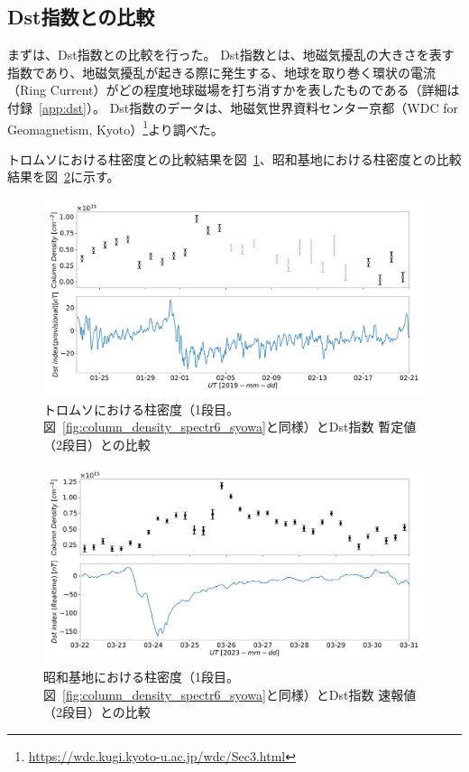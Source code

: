 \subsection{Dst指数との比較}
\label{ssec:comparison_dst}
まずは、Dst指数との比較を行った。
Dst指数とは、地磁気擾乱の大きさを表す指数であり、地磁気擾乱が起きる際に発生する、地球を取り巻く環状の電流（Ring Current）がどの程度地球磁場を打ち消すかを表したものである（詳細は付録~\ref{app:dst}）。
Dst指数のデータは、地磁気世界資料センター京都（WDC for Geomagnetism, Kyoto）\footnote{\url{https://wdc.kugi.kyoto-u.ac.jp/wdc/Sec3.html}}より調べた。\par
トロムソにおける柱密度との比較結果を図~\ref{fig:dst_mmcd_tromsoe}、昭和基地における柱密度との比較結果を図~\ref{fig:dst_mmcd_syowa}に示す。
\begin{figure}[htbp]
    \centering
    \includegraphics[width=\linewidth]{master_thesis_contents/master_thesis_fig/dst_tromsoe_mmcd.pdf}
    \caption{トロムソにおける柱密度（1段目。図~\ref{fig:column_density_spectr6_syowa}と同様）とDst指数 暫定値（2段目）との比較}
    \label{fig:dst_mmcd_tromsoe}
\end{figure}
\begin{figure}[htbp]
    \centering
    \includegraphics[width=\linewidth]{master_thesis_contents/master_thesis_fig/column_density_spectr6_dst_syowa.pdf}
    \caption{昭和基地における柱密度（1段目。図~\ref{fig:column_density_spectr6_syowa}と同様）とDst指数 速報値（2段目）との比較}
    \label{fig:dst_mmcd_syowa}
\end{figure}
